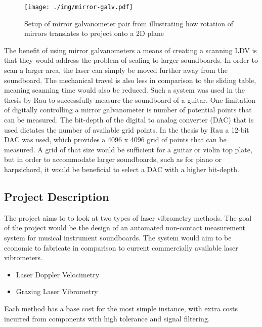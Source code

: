 \begin{figure}[h]
\centering
\texttt{[image: ./img/mirror-galv.pdf]}
\caption{Setup of mirror galvanometer pair from \cite{GALVO} illustrating how
rotation of mirrors translates to project onto a 2D plane}
\label{fig:mirror-galv}
\end{figure}

The benefit of using mirror galvanometers a means of creating a scanning LDV is
that they would address the problem of scaling to larger soundboards. In order
to scan a larger area, the laser can simply be moved further away from the
soundboard. The mechanical travel is also less in comparison to the sliding
table, meaning scanning time would also be reduced. Such a system was used in
the thesis by Rau \cite{RAU_THESIS} to successfully measure the soundboard of a
guitar. One limitation of digitally controlling a mirror galvanometer is number
of potential points that can be measured. The bit-depth of the digital to analog
converter (DAC) that is used dictates the number of available grid points. In
the thesis by Rau \cite{RAU_THESIS} a 12-bit DAC was used, which provides a 4096
x 4096 grid of points that can be measured. A grid of that size would be
sufficient for a guitar or violin top plate, but in order to accommodate larger
soundboards, such as for piano or harpsichord, it would be beneficial to select
a DAC with a higher bit-depth.

\hypertarget{project-description}{%
\subsection{Project Description}\label{project-description}}

The project aims to to look at two types of laser vibrometry methods. 
The goal of the project would be the design of an automated non-contact measurement
system for musical instrument soundboards. The system would aim to be economic
to fabricate in comparison to current commercially available laser vibrometers.

\begin{itemize}
\tightlist
\item
  Laser Doppler Velocimetry
\item
  Grazing Laser Vibrometry
\end{itemize}

Each method has a base cost for the most simple instance, with extra costs
incurred from components with high tolerance and signal filtering.

